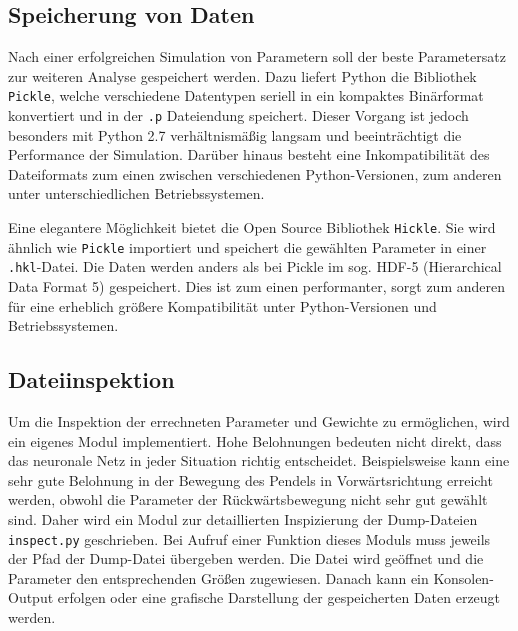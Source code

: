 	\subsection{Speicherung von Daten}
		Nach einer erfolgreichen Simulation von Parametern soll der beste Parametersatz zur weiteren Analyse gespeichert werden. Dazu liefert Python die Bibliothek \texttt{Pickle}, welche verschiedene Datentypen seriell in ein kompaktes Binärformat konvertiert und in der \texttt{.p} Dateiendung speichert. Dieser Vorgang ist jedoch besonders mit Python 2.7 verhältnismäßig langsam und beeinträchtigt die Performance der Simulation. Darüber hinaus besteht eine Inkompatibilität des Dateiformats zum einen zwischen verschiedenen Python-Versionen, zum anderen unter unterschiedlichen Betriebssystemen.
		
		Eine elegantere Möglichkeit bietet die Open Source Bibliothek \texttt{Hickle}. Sie wird ähnlich wie \texttt{Pickle} importiert und speichert die gewählten Parameter in einer \texttt{.hkl}-Datei. Die Daten werden anders als bei Pickle im sog. HDF-5 (Hierarchical Data Format 5) \cite{hdf5} gespeichert. Dies ist zum einen performanter, sorgt zum anderen für eine erheblich größere Kompatibilität unter Python-Versionen und Betriebssystemen.
	\subsection{Dateiinspektion}
		Um die Inspektion der errechneten Parameter und Gewichte zu ermöglichen, wird ein eigenes Modul implementiert. Hohe Belohnungen bedeuten nicht direkt, dass das neuronale Netz in jeder Situation richtig entscheidet. Beispielsweise kann eine sehr gute Belohnung in der Bewegung des Pendels in Vorwärtsrichtung erreicht werden, obwohl die Parameter der Rückwärtsbewegung nicht sehr gut gewählt sind. Daher wird ein Modul zur detaillierten Inspizierung der Dump-Dateien \texttt{inspect.py} geschrieben. Bei Aufruf einer Funktion dieses Moduls muss jeweils der Pfad der Dump-Datei übergeben werden. Die Datei wird geöffnet und die Parameter den entsprechenden Größen zugewiesen. Danach kann ein Konsolen-Output erfolgen oder eine grafische Darstellung der gespeicherten Daten erzeugt werden.


